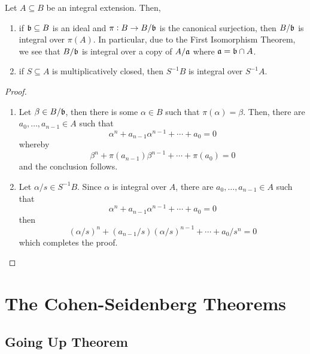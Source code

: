 \begin{proposition}
    Let $A\subseteq B$ be an integral extension. Then, 
    \begin{enumerate}[label=(\alph*)]
        \item if $\mathfrak b\subseteq B$ is an ideal and $\pi: B\to B/\mathfrak b$ is the canonical surjection, then $B/\mathfrak b$ is integral over $\pi(A)$. In particular, due to the First Isomorphism Theorem, we see that $B/\mathfrak b$ is integral over a copy of $A/\mathfrak a$ where $\mathfrak a = \mathfrak b\cap A$.
        \item if $S\subseteq A$ is multiplicatively closed, then $S^{-1}B$ is integral over $S^{-1}A$.
    \end{enumerate}
\end{proposition}
\begin{proof}
\begin{enumerate}[label=(\alph*)]
    \item Let $\beta\in B/\mathfrak b$, then there is some $\alpha\in B$ such that $\pi(\alpha) = \beta$. Then, there are $a_0,\ldots,a_{n - 1}\in A$ such that 
    \begin{equation*}
        \alpha^n + a_{n - 1}\alpha^{n - 1} + \cdots + a_0 = 0
    \end{equation*}
    whereby 
    \begin{equation*}
        \beta^n + \pi(a_{n - 1})\beta^{n - 1} + \cdots + \pi(a_0) = 0
    \end{equation*}
    and the conclusion follows. 
    \item Let $\alpha/s\in S^{-1}B$. Since $\alpha$ is integral over $A$, there are $a_0,\ldots,a_{n - 1}\in A$ such that 
    \begin{equation*}
        \alpha^n + a_{n - 1}\alpha^{n - 1} + \cdots + a_0 = 0
    \end{equation*}
    then 
    \begin{equation*}
        (\alpha/s)^n + (a_{n - 1}/s)(\alpha/s)^{n - 1} + \cdots + a_0/s^n = 0
    \end{equation*}
    which completes the proof.
\end{enumerate}
\end{proof}

\section{The Cohen-Seidenberg Theorems}

\subsection{Going Up Theorem}

